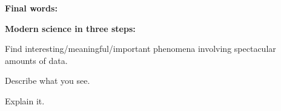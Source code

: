 

  \textbf{Final words:}

  \textbf{Modern science in three steps:}
    
    
      Find interesting/meaningful/important phenomena
      involving spectacular amounts of data.
    
      Describe what you see.
    
      Explain it.
    
  


